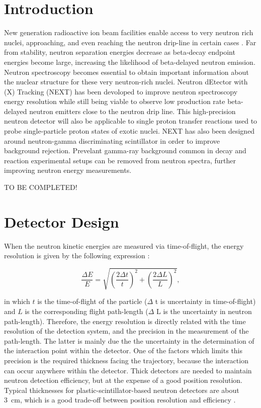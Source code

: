 \documentclass[preprint,3p,twocolumn]{elsarticle}
\begin{document}
\linenumbers

\section{Introduction}
New generation radioactive ion beam facilities enable access to very neutron rich nuclei, approaching, and even reaching the neutron drip-line in certain
cases \cite{FRIB}.
Far from stability, neutron separation energies decrease as beta-decay endpoint energies become large, increasing the likelihood of beta-delayed neutron emission. Neutron spectroscopy becomes essential to obtain important information about the nuclear structure for these very neutron-rich nuclei. 
Neutron dEtector with (X) Tracking (NEXT) has been devoloped to improve neutron spectroscopy energy resolution while still being viable to observe low production rate beta-delayed neutron emitters close to the neutron drip line. 
This high-precision neutron detector will also be applicable to single proton transfer reactions used to probe single-particle proton states of exotic nuclei. NEXT has also been designed around neutron-gamma discriminating scintillator in order to improve background rejection. Prevelant gamma-ray background common in decay and reaction experimental setups can be removed from neutron spectra, further improving neutron energy measurements.
\begin{center}
{ \color{red} TO BE COMPLETED!}
\end{center}
\section{ Detector Design}

When the neutron kinetic  energies are measured via time-of-flight, the energy resolution is given by the following expression \cite{KORNILOV2009226}:

\begin{equation}
\frac{\Delta E}{E}=\sqrt{\left(\frac{2\Delta t}{t}\right )^2+\left(\frac{2\Delta L}{L}\right )^2},
\label{eq:resolution}
\end{equation}

in which $t$  is the time-of-flight of the particle ($\Delta$ t is uncertainty in time-of-flight) and $L$ is the corresponding flight path-length ($\Delta$ L is the uncertainty in neutron path-length). Therefore, the energy resolution is directly related with the time resolution of the detection system, and the precision in the measurement of the path-length. The latter is mainly due the the uncertainty in the determination of the interaction point within the detector. One of the factors which limits this precision is the required thickness facing the trajectory, because the interaction can occur anywhere within the detector. Thick detectors are needed to maintain neutron detection efficiency, but at the expense of a good position resolution. Typical thicknesses for plastic-scintillator-based neutron detectors are about 3~cm, which is a good trade-off between position resolution and efficiency \cite{PETERS2016122,BUTA2000412}.
\end{document}
